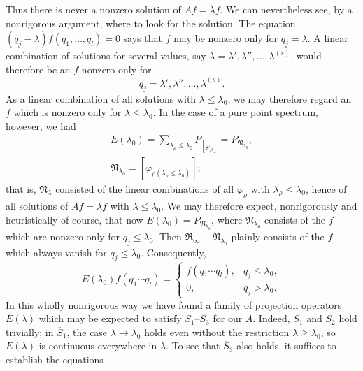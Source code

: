 \documentclass[fontsize=13pt,twoside,openany,headings=normal,parskip=false,bookmarkpackage=false,DIV=calc]{scrbook}
\begin{document}
\hypertarget{origpage-67}{}%
Thus there is never a nonzero solution of $Af=\lambda f$. We can nevertheless see, by a nonrigorous argument, where to look for the solution. The equation $(q_j-\lambda)f(q_1,\ldots,q_l)=0$ says that $f$ may be nonzero only for $q_j=\lambda$. A linear combination of solutions for several values, say $\lambda=\lambda',\lambda'',\ldots,\lambda^{(s)}$, would therefore be an $f$ nonzero only for
\[
q_j=\lambda',\lambda'',\ldots,\lambda^{(s)}.
\]
As a linear combination of all solutions with $\lambda\leq\lambda_0$, we may therefore regard an $f$ which is nonzero only for $\lambda\leq\lambda_0$. In the case of a pure point spectrum, however, we had
\begin{gather*}
E(\lambda_0)=\sum_{\lambda_\rho\leq\lambda_0}P_{[\varphi_\rho]}=P_{\mathfrak{N}_{\lambda_0}},\\
\mathfrak{N}_{\lambda_0}=[\varphi_{\rho(\lambda_\rho\leq\lambda_0)}];
\end{gather*}
that is, $\mathfrak{N}_\lambda$ consisted of the linear combinations of all $\varphi_\rho$ with $\lambda_\rho\leq\lambda_0$, hence of all solutions of $Af=\lambda f$ with $\lambda\leq\lambda_0$. We may therefore expect, nonrigorously and heuristically of course, that now $E(\lambda_0)=P_{\mathfrak{N}_{\lambda_0}}$, where $\mathfrak{N}_{\lambda_0}$ consists of the $f$ which are nonzero only for $q_j\leq\lambda_0$. Then $\mathfrak{R}_\infty-\mathfrak{N}_{\lambda_0}$ plainly consists of the $f$ which always vanish for $q_j\leq\lambda_0$. Consequently,
\[
E(\lambda_0)f(q_1\cdots q_l)=
\begin{cases}f(q_1\cdots q_l),&q_j\leq\lambda_0,\\0,&q_j>\lambda_0.\end{cases}
\]
In this wholly nonrigorous way we have found a family of projection operators $E(\lambda)$ which may be expected to satisfy $\hyperref[cond:II.Sbar1]{\overline{S}_1}$--$\hyperref[cond:II.Sbar3]{\overline{S}_3}$ for our $A$. Indeed, $\hyperref[cond:II.Sbar1]{\overline{S}_1}$ and $\hyperref[cond:II.Sbar2]{\overline{S}_2}$ hold trivially; in $\hyperref[cond:II.Sbar1]{\overline{S}_1}$, the case $\lambda\to\lambda_0$ holds even without the restriction $\lambda\geq\lambda_0$, so $E(\lambda)$ is continuous everywhere in $\lambda$. To see that $\hyperref[cond:II.Sbar3]{\overline{S}_3}$ also holds, it suffices to establish the equations
\end{document}
